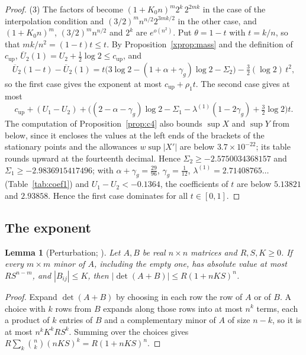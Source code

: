 \documentclass[11pt]{article}
\newtheorem{lemma}[theorem]{Lemma}
\theoremstyle{definition}
\begin{document}
\begin{proof}
(3) The factors of \cite[(6.8)--(6.9)]{Jha} become $(1+K_0n)^m2^k\,2^{2mk}$ in the case of the interpolation condition and $(3/2)^mn^{n/2}2^{3mk/2}$ in the other case, and $(1+K_0n)^m$, $(3/2)^mn^{n/2}$ and $2^k$ are $e^{o(n^2)}$. Put $\theta=1-t$ with $t=k/n$, so that $mk/n^2=(1-t)t\le t$. By Proposition~\ref{xprop:mass} and the definition of $c_{\mathrm{up}}$, $\overline U_2(1)=U_2+\frac12\log2\le c_{\mathrm{up}}$, and
\[
\overline U_2(1-t)-\overline U_2(1)=t\big(3\log2-(1+\alpha+\gamma_g)\log2-\Sigma_2\big)-\tfrac32(\log2)\,t^2,
\]
so the first case gives the exponent at most $c_{\mathrm{up}}+\rho_1t$. The second case gives at most
\[
c_{\mathrm{up}}+(U_1-U_2)+\big((2-\alpha-\gamma_g)\log2-\Sigma_1-\lambda^{(1)}(1-2\gamma_g)+\tfrac32\log2\big)t .
\]
The computation of Proposition~\ref{prop:c4} also bounds $\sup X$ and $\sup Y$ from below, since it encloses the values at the left ends of the brackets of the stationary points and the allowances $w\sup|X'|$ are below $3.7\times10^{-22}$; its table rounds upward at the fourteenth decimal. Hence $\Sigma_2\ge-2.5750034368157$ and $\Sigma_1\ge-2.9836915417496$; with $\alpha+\gamma_g=\frac{29}{96}$, $\gamma_g=\frac1{12}$, $\lambda^{(1)}=2.71408765\ldots$ (Table~\ref{tab:coef1}) and $U_1-U_2<-0.1364$, the coefficients of $t$ are below $5.13821$ and $2.93858$. Hence the first case dominates for all $t\in[0,1]$.
\end{proof}

\subsection{The exponent}\label{xsec:results}

\begin{lemma}[Perturbation; {\cite[Lemma~7.1]{Jha}}]\label{xlem:pert}
Let $A,B$ be real $n\times n$ matrices and $R,S,K\ge0$. If every $m\times m$ minor of $A$, including the empty one, has absolute value at most $RS^{n-m}$, and $|B_{ij}|\le K$, then $|\det(A+B)|\le R(1+nKS)^n$.
\end{lemma}

\begin{proof}
Expand $\det(A+B)$ by choosing in each row the row of $A$ or of $B$. A choice with $k$ rows from $B$ expands along those rows into at most $n^k$ terms, each a product of $k$ entries of $B$ and a complementary minor of $A$ of size $n-k$, so it is at most $n^kK^kRS^k$. Summing over the choices gives $R\sum_k\binom nk(nKS)^k=R(1+nKS)^n$.
\end{proof}
\end{document}

